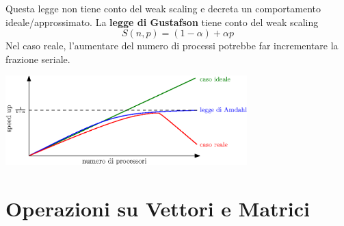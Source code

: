 \documentclass[10pt, letterpaper]{report}
\begin{document}
Questa legge non tiene conto del weak scaling e decreta un comportamento ideale/approssimato. La \textbf{legge 
di Gustafson} tiene conto del weak scaling 
$$ S(n,p)=(1-\alpha)+\alpha p$$
Nel caso reale, l'aumentare del numero di processi potrebbe far incrementare la frazione seriale.\begin{center}
    \includegraphics[width=0.7\textwidth]{images/speedUp.eps}
\end{center}
\flowerLine
\section{Operazioni su Vettori e Matrici}
\end{document}
